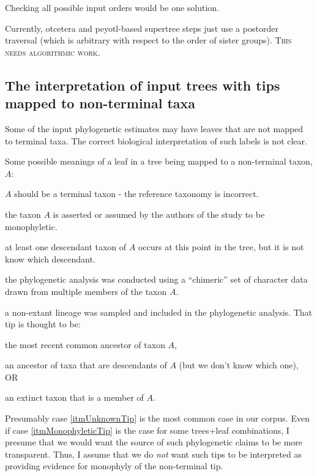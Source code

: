 \documentclass[11pt]{article}
\newcommand{\comment}[1]{{\color{red} \textsc{#1}}\xspace}
\newcommand{\NeedsAlgorithmicWork}{{\comment{This needs algorithmic work.}}}
\begin{document}
Checking all possible input orders would be one solution. 

Currently, otcetera and peyotl-based supertree steps just use a postorder traversal (which is arbitrary with
    respect to the order of sister groups). \NeedsAlgorithmicWork

\subsection{The interpretation of input trees with tips mapped to non-terminal taxa}
Some of the input phylogenetic estimates may have leaves that are not mapped to terminal taxa.
The correct biological interpretation of such labels is not clear.

Some possible meanings of a leaf in a tree being mapped to a non-terminal taxon, $A$:
\begin{compactenum}
    \item $A$ should be a terminal taxon - the reference taxonomy is incorrect.
    \item the taxon $A$ is asserted or assumed by the authors of the study to be monophyletic.\label{itmMonophyleticTip}
    \item at least one descendant taxon of $A$ occurs at this point in the tree, but it is not know which descendant.\label{itmUnknownTip}
    \item the phylogenetic analysis was conducted using a ``chimeric'' set of character data drawn from multiple
        members of the taxon $A$.
    \item a non-extant lineage was sampled and included in the phylogenetic analysis. That tip is thought to be:
    \begin{compactenum}
        \item the most recent common ancestor of taxon $A$,
        \item an ancestor of taxa that are descendants of $A$ (but we don't know which one), OR
        \item an extinct taxon that is a member of $A$.
    \end{compactenum}
\end{compactenum}
Presumably case \ref{itmUnknownTip} is the most common case in our corpus.
Even if case \ref{itmMonophyleticTip} is the case for some trees+leaf combinations, I presume
    that we would want the source of such phylogenetic claims to be more transparent.
Thus, I assume that we do {\em not} want such tips to be interpreted as providing evidence
    for monophyly of the non-terminal tip.
\end{document}
